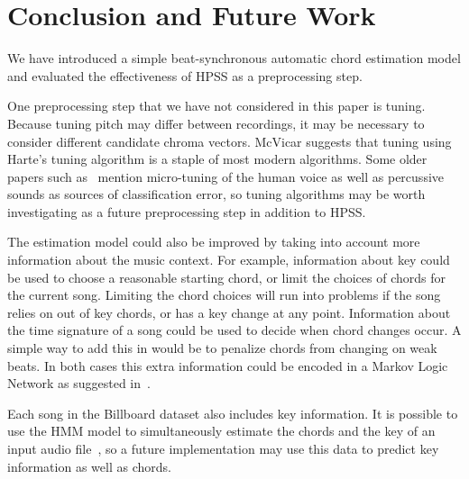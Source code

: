 \documentclass{article}
\begin{document}

\section{Conclusion and Future Work}

We have introduced a simple beat-synchronous automatic chord estimation model
and evaluated the effectiveness of HPSS as a preprocessing step.

One preprocessing step that we have not considered in this paper is tuning.
Because tuning pitch may differ between recordings, it may be necessary to
consider different candidate chroma vectors. McVicar\cite{McVicar:00} suggests that
tuning using Harte's tuning algorithm is a staple of most modern algorithms.
Some older papers such as~\cite{Zenz:20} mention micro-tuning of the human
voice as well as percussive sounds as sources of classification error, so
tuning algorithms may be worth investigating as a future preprocessing step in
addition to HPSS\@.

The estimation model could also be improved by taking into account more
information about the music context. For example, information about key could
be used to choose a reasonable starting chord, or limit the choices of chords
for the current song. Limiting the chord choices will run into problems if the
song relies on out of key chords, or has a key change at any point. Information
about the time signature of a song could be used to decide when chord changes
occur. A simple way to add this in would be to penalize chords from changing on
weak beats. In both cases this extra information could be encoded in a Markov
Logic Network as suggested in~\cite{Papadopoulus:04}.

Each song in the Billboard dataset also includes key information. It is
possible to use the HMM model to simultaneously estimate the chords and the key
of an input audio file~\cite{McVicar:00}, so a future implementation may use
this data to predict key information as well as chords.
\end{document}
